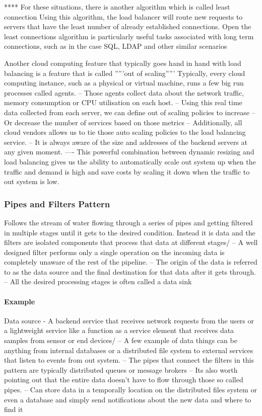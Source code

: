 \documentclass[a4paper, 11pt]{book}
\begin{document}
    **** For these situations, there is another algorithm which is called least connection
    Using this algorithm, the load balancer will route new requests to servers that have the least number of already established connections.
    Open the least connections algorithm is particularly useful tasks associated with long term connections, such as in the case SQL, LDAP and other similar scenarios

    Another cloud computing feature that typically goes hand in hand with load balancing is a feature that is called '''''out of scaling'''''
    Typically, every cloud computing instance, such as a physical or virtual machine, runs a few big run processes called agents.
    -- Those agents collect data about the network traffic, memory consumption or CPU utilisation on each host.
    -- Using this real time data collected from each server, we can define out of scaling policies to increase
    -- Or decrease the number of services based on those metrics
    -- Additionally, all cloud vendors allows us to tie those auto scaling policies to the load balancing service.
    -- It is always aware of the size and addresses of the backend servers at any given moment.
    ---- This powerful combination between dynamic resizing and load balancing gives us the ability to automatically scale out system up when the traffic and demand is high and save costs by scaling it down when the traffic to out system is low.

    \subsubsection{Pipes and Filters Pattern}
    Follows the stream of water flowing through a series of pipes and getting filtered in multiple stages until it gets to the desired condition.
    Instead it is data and the filters are isolated components that process that data at different stages/
    -- A well designed filter performs only a single operation on the incoming data is completely unaware of the rest of the pipeline.
    -- The origin of the data is referred to as the data source and the final destination for that data after it gets through.
    -- All the desired processing stages is often called a data sink

    \paragraph{Example}
    Data source - A backend service that receives network requests from the users or a lightweight service like a function as a service element that receives data samples from sensor or end devices/
    -- A few example of data things can be anything from internal databases or a distributed file system to external services that listen to events from out system.
    -- The pipes that connect the filters in this pattern are typically distributed queues or message brokers
    -- Its also worth pointing out that the entire data doesn't have to flow through those so called pipes.
    -- Can store data in a temporally location on the distributed files system or even a database and simply send notifications about the new data and where to find it
\end{document}

